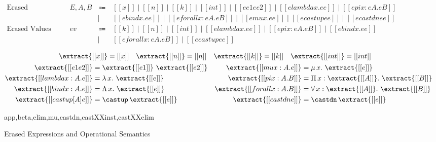 \begin{figure}
  \centering
  \begin{equation*}
  \begin{array}{llcl}
      \text{Erased Expressions} & E, A, B & ~ \Coloneqq ~ & [[x]] \mid [[n]] \mid [[k]] \mid [[int]] \mid [[ee1 ee2]] \mid [[elambda x. ee]] \mid [[epi x : eA. eB]] \\
      & & \mid & [[ebind x. ee]] \mid [[eforall x : eA. eB]] \mid [[emu x. ee]] \mid [[ecastup ee]] \mid [[ecastdn ee]] \\
      \text{Erased Values} & ev & ~ \Coloneqq ~ & [[k]] \mid [[n]] \mid [[int]] \mid [[elambda x. ee]] \mid [[epi x : eA. eB]] \mid [[ebind x. ee]] \\
      & & \mid & [[eforall x : eA. eB]] \mid [[ecastup ee]]
  \end{array}
  \end{equation*}

  \begin{gather*}
    \begin{align*}
    \extract{[[x]]} &= [[x]] &
    \extract{[[n]]} &= [[n]] &
    \extract{[[k]]} &= [[k]] &
    \extract{[[int]]} &= [[int]]
    \end{align*} \\
    \begin{align*}
     \extract{[[e1 e2]]} &= \extract{[[e1]]} ~ \extract{[[e2]]} & %
      \extract{[[mu x : A. e]]} &= \mu \, x. ~ \extract{[[e]]} \\
     \extract{[[lambda x : A. e]]} &= \lambda \, x. ~ \extract{[[e]]} & %
      \extract{[[pi x : A. B]]} &= \Pi \, x : \extract{[[A]]}. ~ \extract{[[B]]} \\
     \extract{[[bind x : A. e]]} &= \Lambda \, x. ~ \extract{[[e]]} & %
      \extract{[[forall x : A. B]]} &= \forall \, x : \extract{[[A]]}. ~ \extract{[[B]]} \\
     \extract{[[castup [A] e]]} &= \castup \, \extract{[[e]]} & %
      \extract{[[castdn e]]} &= \castdn \, \extract{[[e]]}
    \end{align*}
  \end{gather*}

    {app,beta,elim,mu,castdn,castXXinst,castXXelim}
  \caption{Erased Expressions and Operational Semantics}
  \label{fig:extraction}
\end{figure}

